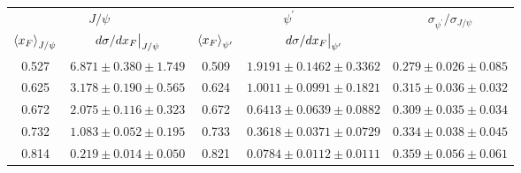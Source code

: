 \begin{tabular}{cc|cc|c}
\hline
\multicolumn{2}{c|}{$J/\psi$} &
  \multicolumn{2}{c|}{$\psi^{\prime}$} &
  \multirow{2}{*}{$\sigma_{\psi^\prime}/\sigma_{J/\psi}$} \\ \cline{1-4}
$\expval{x_F}_{J/\psi}$ &
  $\eval{d\sigma/dx_F}_{J/\psi}$ &
  $\expval{x_F}_{\psi^\prime}$ &
  $\eval{d\sigma/dx_F}_{\psi^\prime}$ &
   \\ \hline
\multicolumn{1}{c|}{0.527} &
  $6.871\pm0.380\pm1.749$ &
  \multicolumn{1}{c|}{0.509} &
  $1.9191\pm0.1462\pm0.3362$ &
  $0.279\pm0.026\pm0.085$ \\
\multicolumn{1}{c|}{0.625} &
  $3.178\pm0.190\pm0.565$ &
  \multicolumn{1}{c|}{0.624} &
  $1.0011\pm0.0991\pm0.1821$ &
  $0.315\pm0.036\pm0.032$ \\
\multicolumn{1}{c|}{0.672} &
  $2.075\pm0.116\pm0.323$ &
  \multicolumn{1}{c|}{0.672} &
  $0.6413\pm0.0639\pm0.0882$ &
  $0.309\pm0.035\pm0.034$ \\
\multicolumn{1}{c|}{0.732} &
  $1.083\pm0.052\pm0.195$ &
  \multicolumn{1}{c|}{0.733} &
  $0.3618\pm0.0371\pm0.0729$ &
  $0.334\pm0.038\pm0.045$ \\
\multicolumn{1}{c|}{0.814} &
  $0.219\pm0.014\pm0.050$ &
  \multicolumn{1}{c|}{0.821} &
  $0.0784\pm0.0112\pm0.0111$ &
  $0.359\pm0.056\pm0.061$ \\ \hline
\end{tabular}
